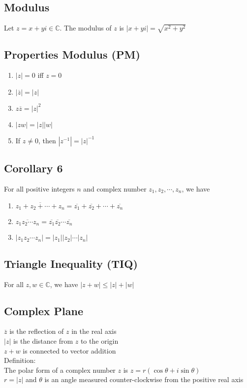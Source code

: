\documentclass[12pt, letterpaper]{article}
\begin{document}
\subsection{Modulus}
Let $z = x+yi \in \mathbb{C}$. The modulus of $z$ is $|x+yi| = \sqrt{x^2+y^2}$
\subsection{Properties Modulus (PM)}
\begin{enumerate}
    \item $|z| = 0$ iff $z = 0$
    \item $|\overline{z}| = |z|$
    \item $z\overline{z} = |z|^2$
    \item $|zw| = |z||w|$
    \item If $z \neq 0$, then $|z^{-1}| = |z|^{-1}$
\end{enumerate}
\subsection{Corollary 6}
For all positive integers $n$ and complex number $z_1, z_2, \cdots, z_n$, we have
\begin{enumerate}
    \item $\overline{z_1+z_2+\cdots+z_n} = \overline{z_1}+\overline{z_2}+\cdots+\overline{z_n}$
    \item $\overline{z_1z_2\cdots z_n} = \overline{z_1}\overline{z_2}\cdots\overline{z_n}$
    \item $|z_1z_2\cdots z_n| = |z_1||z_2|\cdots|z_n|$
\end{enumerate}
\subsection{Triangle Inequality (TIQ)}
For all $z,w \in \mathbb{C}$, we have $|z+w| \leq |z|+|w|$
\subsection{Complex Plane}
$\overline{z}$ is the reflection of $z$ in the real axis \\
$|z|$ is the distance from $z$ to the origin \\
$z+w$ is connected to vector addition \\
Definition: \\
The polar form of a complex number $z$ is $z = r(\cos\theta + i\sin\theta)$ \\
$r = |z|$ and $\theta$ is an angle measured counter-clockwise from the positive real axis 
\end{document}
